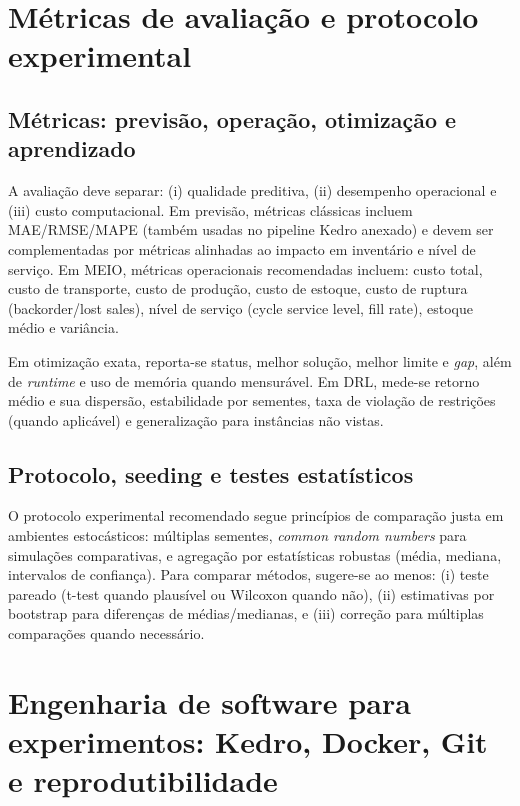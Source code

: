 \section{Métricas de avaliação e protocolo experimental}

\subsection{Métricas: previsão, operação, otimização e aprendizado}

A avaliação deve separar: (i) qualidade preditiva, (ii) desempenho operacional e (iii) custo computacional. Em previsão, métricas clássicas incluem MAE/RMSE/MAPE (também usadas no pipeline Kedro anexado) e devem ser complementadas por métricas alinhadas ao impacto em inventário e nível de serviço. \cite{Nasseri2023RetailDemandPrediction,TadayonradNdiaye2023KPIDemandForecasting} Em MEIO, métricas operacionais recomendadas incluem: custo total, custo de transporte, custo de produção, custo de estoque, custo de ruptura (backorder/lost sales), nível de serviço (cycle service level, fill rate), estoque médio e variância. \cite{Axsater2006InventoryControl,Zipkin2000FoundationsInventory}

Em otimização exata, reporta-se status, melhor solução, melhor limite e \emph{gap}, além de \emph{runtime} e uso de memória quando mensurável. Em DRL, mede-se retorno médio e sua dispersão, estabilidade por sementes, taxa de violação de restrições (quando aplicável) e generalização para instâncias não vistas. \cite{Boute2022DRLInventoryRoadmap,Geevers2024MEIODRL}

\subsection{Protocolo, seeding e testes estatísticos}

O protocolo experimental recomendado segue princípios de comparação justa em ambientes estocásticos: múltiplas sementes, \emph{common random numbers} para simulações comparativas, e agregação por estatísticas robustas (média, mediana, intervalos de confiança). \cite{Law2015SimulationModeling} Para comparar métodos, sugere-se ao menos: (i) teste pareado (t-test quando plausível ou Wilcoxon quando não), (ii) estimativas por bootstrap para diferenças de médias/medianas, e (iii) correção para múltiplas comparações quando necessário.

\section{Engenharia de software para experimentos: Kedro, Docker, Git e reprodutibilidade}

